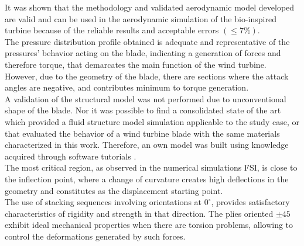 It was shown that the methodology and validated aerodynamic model developed are valid and can be used in the aerodynamic simulation of the bio-inspired turbine because of the reliable results and acceptable errors $(\leq7{\%})$.\\

The pressure distribution profile obtained is adequate and representative of the pressures’ behavior acting on the blade, indicating a generation of forces and therefore torque, that demarcates the main function of the wind turbine. However, due to the geometry of the blade, there are sections where the attack angles are negative, and contributes minimum to torque generation.\\
 
A validation of the structural model was not performed due to unconventional shape of the blade. Nor it was possible to find a consolidated state of the art which provided a fluid structure model simulation applicable to the study case, or that evaluated the behavior of a wind turbine blade with the same materials characterized in this work. Therefore, an own model was built using knowledge acquired through software tutorials \cite{ansys}.\\

The most critical region, as observed in the numerical simulations FSI, is close to the inflection point, where a change of curvature creates high deflections in the geometry and constitutes as the displacement starting point.\\

The use of stacking sequences involving orientations at $0^\circ$, provides satisfactory characteristics of rigidity and strength in that direction. The plies oriented $\pm 45$ exhibit ideal mechanical properties when there are torsion problems, allowing to control the deformations generated by such forces.\\

